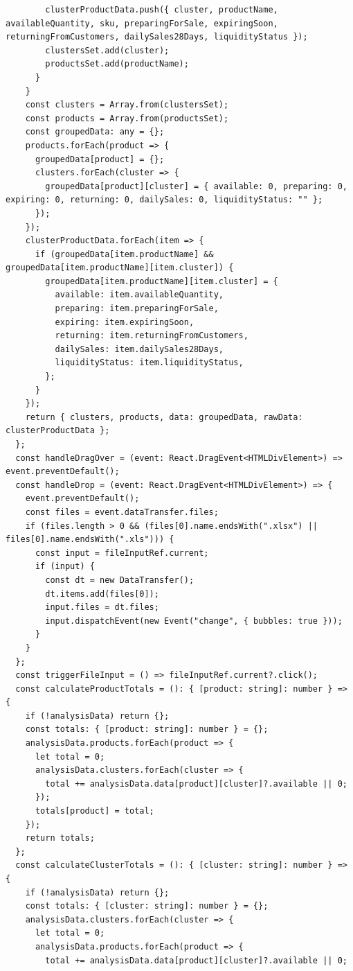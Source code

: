 \begin{code}
\begin{verbatim}
        clusterProductData.push({ cluster, productName, availableQuantity, sku, preparingForSale, expiringSoon, returningFromCustomers, dailySales28Days, liquidityStatus });
        clustersSet.add(cluster);
        productsSet.add(productName);
      }
    }
    const clusters = Array.from(clustersSet);
    const products = Array.from(productsSet);
    const groupedData: any = {};
    products.forEach(product => {
      groupedData[product] = {};
      clusters.forEach(cluster => {
        groupedData[product][cluster] = { available: 0, preparing: 0, expiring: 0, returning: 0, dailySales: 0, liquidityStatus: "" };
      });
    });
    clusterProductData.forEach(item => {
      if (groupedData[item.productName] && groupedData[item.productName][item.cluster]) {
        groupedData[item.productName][item.cluster] = {
          available: item.availableQuantity,
          preparing: item.preparingForSale,
          expiring: item.expiringSoon,
          returning: item.returningFromCustomers,
          dailySales: item.dailySales28Days,
          liquidityStatus: item.liquidityStatus,
        };
      }
    });
    return { clusters, products, data: groupedData, rawData: clusterProductData };
  };
  const handleDragOver = (event: React.DragEvent<HTMLDivElement>) => event.preventDefault();
  const handleDrop = (event: React.DragEvent<HTMLDivElement>) => {
    event.preventDefault();
    const files = event.dataTransfer.files;
    if (files.length > 0 && (files[0].name.endsWith(".xlsx") || files[0].name.endsWith(".xls"))) {
      const input = fileInputRef.current;
      if (input) {
        const dt = new DataTransfer();
        dt.items.add(files[0]);
        input.files = dt.files;
        input.dispatchEvent(new Event("change", { bubbles: true }));
      }
    }
  };
  const triggerFileInput = () => fileInputRef.current?.click();
  const calculateProductTotals = (): { [product: string]: number } => {
    if (!analysisData) return {};
    const totals: { [product: string]: number } = {};
    analysisData.products.forEach(product => {
      let total = 0;
      analysisData.clusters.forEach(cluster => {
        total += analysisData.data[product][cluster]?.available || 0;
      });
      totals[product] = total;
    });
    return totals;
  };
  const calculateClusterTotals = (): { [cluster: string]: number } => {
    if (!analysisData) return {};
    const totals: { [cluster: string]: number } = {};
    analysisData.clusters.forEach(cluster => {
      let total = 0;
      analysisData.products.forEach(product => {
        total += analysisData.data[product][cluster]?.available || 0;

\end{verbatim}
\end{code}
